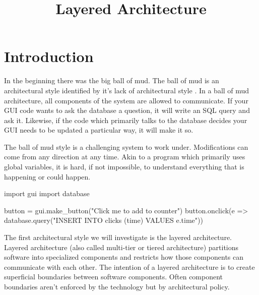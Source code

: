 \title{Layered Architecture}
\maketitle

\section{Introduction}
In the beginning there was the big ball of mud.
The ball of mud is an architectural style identified by it's lack of architectural style \cite{ballofmud}.
In a ball of mud architecture, all components of the system are allowed to communicate.
If your GUI code wants to ask the database a question, it will write an SQL query and ask it.
Likewise, if the code which primarily talks to the database decides your GUI needs to be updated a particular way, it will make it so.

The ball of mud style is a challenging system to work under.
Modifications can come from any direction at any time.
Akin to a program which primarily uses global variables,
it is hard, if not impossible,
to understand everything that is happening or could happen.



\begin{code}[style=python]
import gui
import database

button = gui.make_button("Click me to add to counter")
button.onclick(e => 
    database.query("INSERT INTO clicks (time) VALUES {{e.time}}"))
\end{code}

The first architectural style we will investigate is the layered architecture.
Layered architecture (also called multi-tier or tiered architecture) 
partitions software into specialized components and restricts how those components can communicate with each other.
The intention of a layered architecture is to create superficial boundaries between software components.
Often component boundaries aren't enforced by the technology but by architectural policy.



